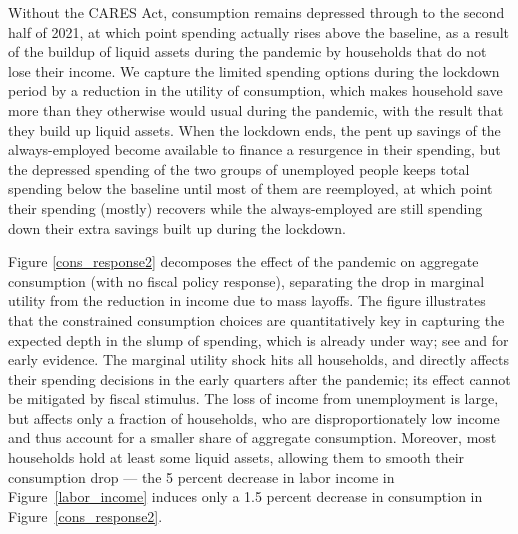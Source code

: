 \documentclass[titlepage]{\econtex}
\begin{document}
Without the CARES Act, consumption remains depressed through to the second half of 2021, at which point spending actually rises above the baseline, as a result of the buildup of liquid assets during the pandemic by households that do not lose their income.
We capture the limited spending options during the lockdown period by a reduction in the utility of consumption, which makes household save more than they otherwise would usual during the pandemic, with the result that they build up liquid assets.
When the lockdown ends, the pent up savings of the always-employed become available to finance a resurgence in their spending, but the depressed spending of the two groups of unemployed people keeps total spending below the baseline until most of them are reemployed, at which point their spending (mostly) recovers while the always-employed are still spending down their extra savings built up during the lockdown.

Figure \ref{cons_response2} decomposes the effect of the pandemic on aggregate consumption (with no fiscal policy response), separating the drop in marginal utility from the reduction in income due to mass layoffs.
The figure illustrates that the constrained consumption choices are quantitatively key in capturing the expected depth in the slump of spending, which is already under way; see \cite{baker_Cpandemic} and \cite{nyFedCoronaBlog} for early evidence.
The marginal utility shock hits all households, and directly affects their spending decisions in the early quarters after the pandemic; its effect cannot be mitigated by fiscal stimulus.
The loss of income from unemployment is large, but affects only a fraction of households, who are disproportionately low income and thus account for a smaller share of aggregate consumption.
Moreover, most households hold at least some liquid assets, allowing them to smooth their consumption drop --- the 5 percent  decrease in labor income in Figure~\ref{labor_income} induces only a 1.5 percent  decrease in consumption in Figure~\ref{cons_response2}.
\end{document}
